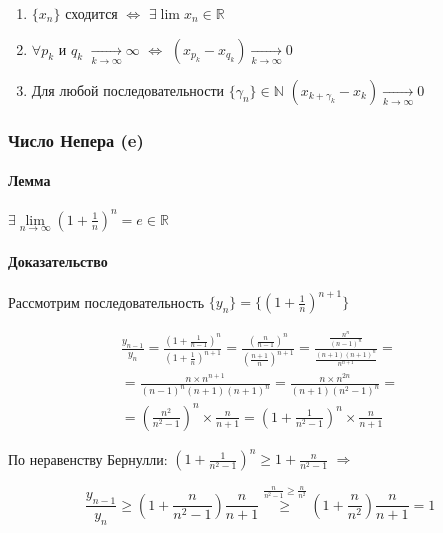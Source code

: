 \documentclass[class=article,a4paper,12pt,crop=false]{standalone}
\begin{document}
\begin{enumerate}
    \item {
        $\{x_n\}$ сходится $\Leftrightarrow$ $\exists \lim{x_n} \in \mathbb{R}$
    }
    \item {
        $\forall p_k$ и $q_k$ $\underset{k \rightarrow \infty}{\rightarrow} \infty$ $\Leftrightarrow$
        $(x_{p_k} - x_{q_k}) \underset{k \rightarrow \infty}{\rightarrow} 0$
    }
    \item {
        Для любой последовательности $\{\gamma_n\} \in \mathbb{N}$ $(x_{k + \gamma_k} - x_k) \underset{k \rightarrow \infty}{\rightarrow} 0$
    }
\end{enumerate}

\subsubsection{Число Непера (e)}

\paragraph{Лемма} $\exists \lim\limits_{n \rightarrow \infty}(1 + \frac{1}{n})^n = e \in \mathbb{R}$

\paragraph{Доказательство} Рассмотрим последовательность $\{y_n\} = \{(1 + \frac{1}{n})^{n + 1}\}$

\begin{multline}
    \frac{y_{n - 1}}{y_n} =
    \frac{(1 + \frac{1}{n - 1})^n}{(1 + \frac{1}{n})^{n + 1}} =
    \frac{\left(\frac{n}{n - 1}\right)^n}{\left(\frac{n + 1}{n}\right)^{n + 1}} =
    \frac{\frac{n^n}{(n-1)^n}}{\frac{(n + 1)(n + 1)^n}{n^{n + 1}}} = \\
    = \frac{n \times n^{n + 1}}{(n - 1)^n(n + 1)(n + 1)^n} =
    \frac{n\times n^{2n}}{(n + 1)(n^2 - 1)^n} = \\
    = \left(\frac{n^2}{n^2 - 1}\right)^n \times \frac{n}{n + 1} =
    \left(1 + \frac{1}{n^2 - 1}\right)^n \times \frac{n}{n + 1}
\end{multline}

По неравенству Бернулли: $\left(1 + \frac{1}{n^2 - 1}\right)^n \geq 1 + \frac{n}{n ^2 -1}$ $\Rightarrow$

\begin{equation}
    \frac{y_{n - 1}}{y_n} \geq \left(1 + \frac{n}{n^2 - 1}\right)\frac{n}{n + 1}
    \overset{\frac{n}{n^2 - 1} \geq \frac{n}{n^2}}{\geq}
    (1 + \frac{n}{n^2})\frac{n}{n + 1} = 1
\end{equation}
\end{document}
